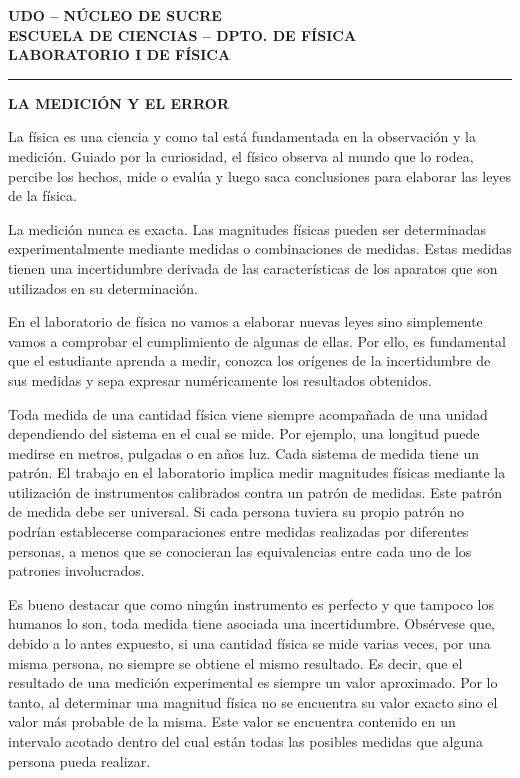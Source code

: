 \documentclass[12pt,a4paper]{article}
\begin{document}
\begin{center}
    \textbf{\Large UDO – NÚCLEO DE SUCRE}\\
    \vspace{0.2cm}
    \textbf{\large ESCUELA DE CIENCIAS – DPTO. DE FÍSICA}\\
    \vspace{0.2cm}
    \textbf{\large LABORATORIO I DE FÍSICA}
\end{center}

\vspace{0.5cm}
\hrule
\vspace{0.5cm}

\tableofcontents
\newpage

\begin{center}
    \textbf{\LARGE LA MEDICIÓN Y EL ERROR}
\end{center}
\vspace{0.3cm}

La física es una ciencia y como tal está fundamentada en la observación y la medición. Guiado por la curiosidad, el físico observa al mundo que lo rodea, percibe los hechos, mide o evalúa y luego saca conclusiones para elaborar las leyes de la física.

La medición nunca es exacta. Las magnitudes físicas pueden ser determinadas experimentalmente mediante medidas o combinaciones de medidas. Estas medidas tienen una incertidumbre derivada de las características de los aparatos que son utilizados en su determinación.

En el laboratorio de física no vamos a elaborar nuevas leyes sino simplemente vamos a comprobar el cumplimiento de algunas de ellas. Por ello, es fundamental que el estudiante aprenda a medir, conozca los orígenes de la incertidumbre de sus medidas y sepa expresar numéricamente los resultados obtenidos.

Toda medida de una cantidad física viene siempre acompañada de una unidad dependiendo del sistema en el cual se mide. Por ejemplo, una longitud puede medirse en metros, pulgadas o en años luz. Cada sistema de medida tiene un patrón. El trabajo en el laboratorio implica medir magnitudes físicas mediante la utilización de instrumentos calibrados contra un patrón de medidas. Este patrón de medida debe ser universal. Si cada persona tuviera su propio patrón no podrían establecerse comparaciones entre medidas realizadas por diferentes personas, a menos que se conocieran las equivalencias entre cada uno de los patrones involucrados.

Es bueno destacar que como ningún instrumento es perfecto y que tampoco los humanos lo son, toda medida tiene asociada una incertidumbre. Obsérvese que, debido a lo antes expuesto, si una cantidad física se mide varias veces, por una misma persona, no siempre se obtiene el mismo resultado. Es decir, que el resultado de una medición experimental es siempre un valor aproximado. Por lo tanto, al determinar una magnitud física no se encuentra su valor exacto sino el valor más probable de la misma. Este valor se encuentra contenido en un intervalo acotado dentro del cual están todas las posibles medidas que alguna persona pueda realizar.
\end{document}
